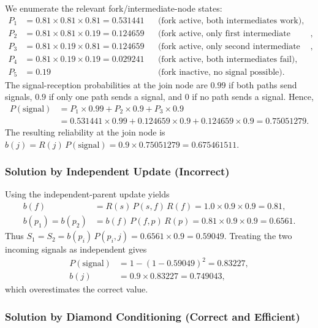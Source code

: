 \documentclass[preprint,12pt]{elsarticle}
\theoremstyle{definition}
\begin{document}
We enumerate the relevant fork/intermediate-node states:
\begin{align*}
P_1&=0.81\times0.81\times0.81=0.531441 &&\text{(fork active, both intermediates work)},\\
P_2&=0.81\times0.81\times0.19=0.124659 &&\text{(fork active, only first intermediate works)},\\
P_3&=0.81\times0.19\times0.81=0.124659 &&\text{(fork active, only second intermediate works)},\\
P_4&=0.81\times0.19\times0.19=0.029241 &&\text{(fork active, both intermediates fail)},\\
P_5&=0.19 &&\text{(fork inactive, no signal possible)}.
\end{align*}
The signal-reception probabilities at the join node are $0.99$ if both paths send signals, $0.9$ if only
one path sends a signal, and $0$ if no path sends a signal. Hence,
\begin{align*}
P(\text{signal})&=P_1\times0.99+P_2\times0.9+P_3\times0.9\\
&=0.531441\times0.99+0.124659\times0.9+0.124659\times0.9=0.75051279 .
\end{align*}
The resulting reliability at the join node is
$b(j)=R(j)\,P(\text{signal})=0.9\times0.75051279=0.675461511$.

\subsubsection{Solution by Independent Update (Incorrect)}

Using the independent-parent update yields
\begin{align*}
b(f)&=R(s)\,P(s,f)\,R(f)=1.0\times0.9\times0.9=0.81,\\
b(p_1)=b(p_2)&=b(f)\,P(f,p)\,R(p)=0.81\times0.9\times0.9=0.6561 .
\end{align*}
Thus $S_1=S_2=b(p_i)\,P(p_i,j)=0.6561\times0.9=0.59049$. Treating the two incoming signals as
independent gives
\begin{align*}
P(\text{signal})&=1-(1-0.59049)^2=0.83227,\\
b(j)&=0.9\times0.83227=0.749043,
\end{align*}
which overestimates the correct value.

\subsubsection{Solution by Diamond Conditioning (Correct and Efficient)}
\end{document}
